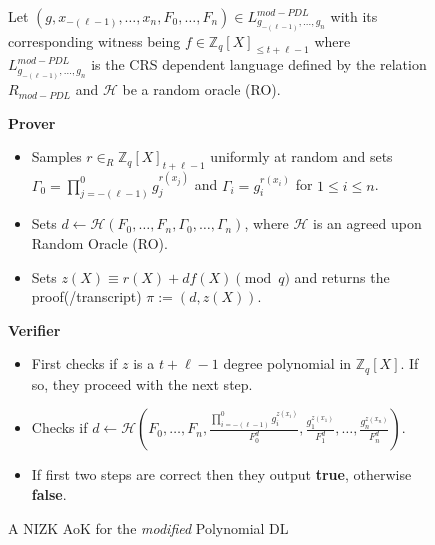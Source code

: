 \begin{figure}[t!]
    \centering
    \begin{tcolorbox}[title=$\pi_{mod-PDL}^{AoK}$, width=0.9\textwidth, colframe=blue!75!black, colback=blue!10, sharp corners]
        Let $(g,x_{-(\ell-1)},\dots,x_n,F_0,\dots,F_n)\in L_{g_{-(\ell-1)},\dots,g_n}^{mod-PDL}$ with its corresponding witness being $f\in\mathbb{Z}_q[X]_{\leq t+\ell-1}$ 
        where $L_{g_{-(\ell-1)},\dots,g_n}^{mod-PDL}$ is the CRS dependent language defined by 
        the relation $R_{mod-PDL}$ and $\mathcal{H}$ be a random oracle (RO).
        
        \vspace{0.5em}
        \textbf{Prover}
        \begin{itemize}
            \item Samples $r\in_{R}\mathbb{Z}_q[X]_{t+\ell-1}$ uniformly at random and sets 
                $\Gamma_0=\prod_{j=-(\ell-1)}^{0}g_j^{r(x_j)}$ and $\Gamma_i=g_i^{r(x_i)}$ for 
                $1\leq i\leq n$.
            \item Sets $d\leftarrow \mathcal{H}(F_0, \dots, F_n, \Gamma_0,\dots,\Gamma_n)$, where $\mathcal{H}$ is 
                an agreed upon Random Oracle (RO).
            \item Sets $z(X)\equiv r(X)+df(X) \pmod{q}$ and returns the proof(/transcript) $\pi:= (d,z(X))$.
        \end{itemize}
        
        \vspace{0.5em}
        \textbf{Verifier}
        \begin{itemize}
            \item First checks if $z$ is a $t+\ell-1$ degree polynomial in $\mathbb{Z}_q[X]$. If so, they proceed with the next step.
            \item Checks if $d\leftarrow \mathcal{H}(F_0, \dots, F_n,\frac{\prod_{i=-(\ell-1)}^{0}g_i^{z(x_i)}}{F_0^d},\frac{g_1^{z(x_1)}}{F_1^d},\dots,\frac{g_n^{z(x_n)}}{F_n^d})$. 
            \item If first two steps are correct then they output \textbf{true}, otherwise \textbf{false}.
        \end{itemize}
    \end{tcolorbox}
    \caption{A NIZK AoK for the \textit{modified} Polynomial DL}
    \label{fig:mod-polynomial-dl-init}
\end{figure}
